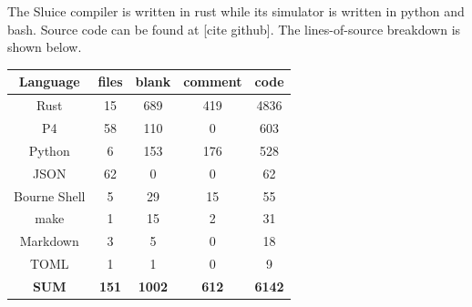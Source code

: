 \documentclass[12pt, oneside]{article}
\begin{document}
The Sluice compiler is written in rust while its simulator is written in python and bash. Source code can be found at [cite github]. The lines-of-source breakdown is shown below.

\begin{center}
 \begin{tabular} {|c c c c c|} 
 \hline
 Language &  files & blank & comment & code  \\ [0.5ex] 
  \hline\hline
Rust &	15  & 689 & 419 &  4836\\
 \hline\hline
P4&	58 & 110 & 0 & 603 \\
 \hline
Python& 6 & 153 & 176 & 528 \\
 \hline
JSON&	62 & 0 & 0 & 62 \\
 \hline
Bourne Shell&	5 & 29 & 15 & 55 \\
 \hline
make & 1 & 15 & 2 & 31 \\
 \hline
Markdown & 3 & 5 & 0 & 18 \\
 \hline
TOML & 1 & 1 & 0 & 9 \\
 \hline
 \textbf{SUM} & \textbf{151} & \textbf{1002} & \textbf{612} & \textbf{6142} \\
 \hline
\end{tabular}
\end{center}
\end{document}
